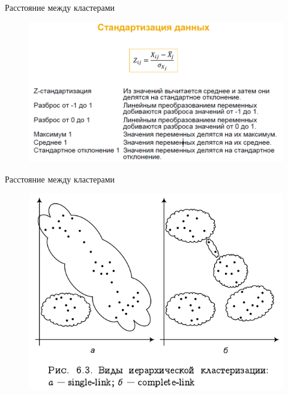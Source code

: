 \documentclass{beamer}
\begin{document}
\begin{frame}{Расстояние между кластерами}
\begin{figure}[h]
\centering
\includegraphics[scale=0.4]{images/lec07-pic24.png}
\end{figure}
\end{frame}

\begin{frame}{Расстояние между кластерами}
\begin{figure}[h]
\centering
\includegraphics[scale=0.6]{images/lec07-pic18.png}
\end{figure}
\end{frame}
\end{document}
